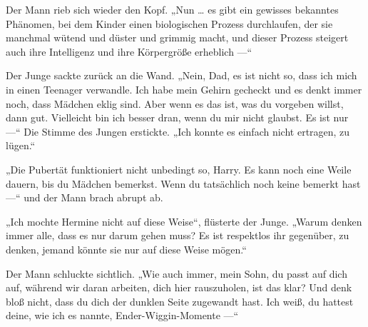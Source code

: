 Der Mann rieb sich wieder den Kopf.
„Nun … es gibt ein gewisses bekanntes Phänomen, bei dem Kinder einen biologischen Prozess durchlaufen, der sie manchmal wütend und düster und grimmig macht, und dieser Prozess steigert auch ihre Intelligenz und ihre Körpergröße erheblich —“

Der Junge sackte zurück an die Wand.
„Nein, Dad, es ist nicht so, dass ich mich in einen Teenager verwandle. Ich habe mein Gehirn gecheckt und es denkt immer noch, dass Mädchen eklig sind. Aber wenn es das ist, was du vorgeben willst, dann gut. Vielleicht bin ich besser dran, wenn du mir nicht glaubst. Es ist nur —“ Die Stimme des Jungen erstickte.
„Ich konnte es einfach nicht ertragen, zu lügen.“

„Die Pubertät funktioniert nicht unbedingt so, Harry. Es kann noch eine Weile dauern, bis du Mädchen bemerkst. Wenn du tatsächlich noch keine bemerkt hast —“ und der Mann brach abrupt ab.

„Ich mochte Hermine nicht auf diese Weise“, flüsterte der Junge.
„Warum denken immer alle, dass es nur darum gehen muss? Es ist respektlos ihr gegenüber, zu denken, jemand könnte sie nur auf diese Weise mögen.“

Der Mann schluckte sichtlich.
„Wie auch immer, mein Sohn, du passt auf dich auf, während wir daran arbeiten, dich hier rauszuholen, ist das klar? Und denk bloß nicht, dass du dich der dunklen Seite zugewandt hast. Ich weiß, du hattest deine, wie ich es nannte, Ender-Wiggin-Momente —“

